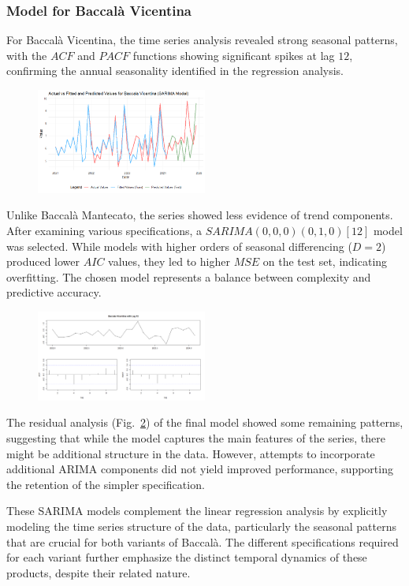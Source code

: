 \documentclass[10pt,twocolumn,letterpaper]{article}
\begin{document}
\subsubsection{Model for Baccalà Vicentina}
For Baccalà Vicentina, the time series analysis revealed strong seasonal patterns, with the $ACF$ and $PACF$ functions showing significant spikes at lag $12$, confirming the annual seasonality identified in the regression analysis. 
\begin{figure}[H]
    \centering
    \includegraphics[width=0.5\textwidth]{PlotsBEFD/PRED_SARIMA_VIC.png} 
    \caption{}
    \label{fig:PRED_SARIMA_VIC}
\end{figure}
Unlike Baccalà Mantecato, the series showed less evidence of trend components.
After examining various specifications, a $SARIMA(0,0,0)(0,1,0)[12]$ model was selected.
While models with higher orders of seasonal differencing ($D=2$) produced lower $AIC$ values, they led to higher $MSE$ on the test set, indicating overfitting. The chosen model represents a balance between complexity and predictive accuracy.
\begin{figure}[H]
    \centering
    \includegraphics[width=0.5\textwidth]{PlotsBEFD/ACF_VIC_LAG12.png} 
    \caption{}
    \label{fig:ACF_VIC_LAG12}
\end{figure}
The residual analysis (Fig.~\ref{fig:ACF_VIC_LAG12}) of the final model showed some remaining patterns, suggesting that while the model captures the main features of the series, there might be additional structure in the data. However, attempts to incorporate additional ARIMA components did not yield improved performance, supporting the retention of the simpler specification.

These SARIMA models complement the linear regression analysis by explicitly modeling the time series structure of the data, particularly the seasonal patterns that are crucial for both variants of Baccalà. The different specifications required for each variant further emphasize the distinct temporal dynamics of these products, despite their related nature.
\end{document}
